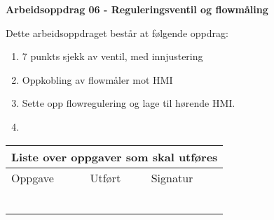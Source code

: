 
\noindent
{\bf Arbeidsoppdrag 06 - Reguleringsventil og flowmåling}

\vskip 5pt


Dette arbeidsoppdraget består at følgende oppdrag:
\begin{enumerate}
	\item 7 punkts sjekk av ventil, med innjustering
	\item Oppkobling av flowmåler mot HMI 
	\item Sette opp flowregulering og lage til hørende HMI. 
	\item 
\end{enumerate}
\vskip 5pt

\begin{center}
\begin{tabular}{ | m{8cm} | m{1cm}| m{2cm} | } 
\hline
\multicolumn{3}{|c|}{Liste over oppgaver som skal utføres} \\
	\hline
	Oppgave	& Utført & Signatur \\ 
	\hline
	\hline
	& & \\ 
	\hline
	& & \\ 
	\hline
	& & \\ 
	\hline
	& & \\ 
	\hline
	& & \\ 
	\hline
	& & \\ 
	\hline
\end{tabular}
\end{center}



